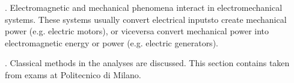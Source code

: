 \documentclass[letterpaper,10pt,english]{jupyterBook}
\begin{document}
\sphinxAtStartPar
{\hyperref[\detokenize{ch/circuits-electromechanic-old:classical-electromagnetism-circuits-electromechanic}]{}}. Electromagnetic and mechanical phenomena interact in electromechanical systems. These systems usually convert electrical inputsto create mechanical power (e.g. electric motors), or viceversa convert mechanical power into electromagnetic energy or power (e.g. electric generators).

\sphinxAtStartPar
{\hyperref[\detokenize{ch/electrical-engineering-networks:classical-electromagnetism-electrical-engineering-newtork-analysis}]{}}. Classical methods in the analyses are discussed. This section contains {\hyperref[\detokenize{ch/electrical-engineering-exercises:classical-electromagnetism-electrical-engineering-exercises}]{}} taken from exams at Politecnico di Milano.



\sphinxstepscope
\end{document}
